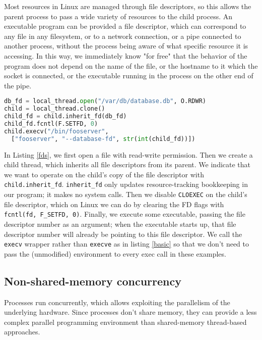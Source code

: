\documentclass{acmart}
\begin{document}
Most resources in Linux are managed through file descriptors,
so this allows the parent process to pass a wide variety of resources to the child process.
An executable program can be provided a file descriptor,
which can correspond to any file in any filesystem,
or to a network connection\cite{ucspi},
or a pipe connected to another process,
without the process being aware of what specific resource it is accessing.
In this way, we immediately know "for free"\cite{theoremsforfree}
that the behavior of the program does not depend on the name of the file,
or the hostname to it which the socket is connected,
or the executable running in the process on the other end of the pipe.
\begin{lstlisting}[float,language=Python,label={fds},caption={Passing down FDs}]
db_fd = local_thread.open("/var/db/database.db", O.RDWR)
child = local_thread.clone()
child_fd = child.inherit_fd(db_fd)
child_fd.fcntl(F.SETFD, 0)
child.execv("/bin/fooserver",
  ["fooserver", "--database-fd", str(int(child_fd))])
\end{lstlisting}
In Listing \ref{fds},
we first open a file with read-write permission.
Then we create a child thread,
which inherits all file descriptors from its parent.
We indicate that we want to operate on the child's copy of the file descriptor with \verb|child.inherit_fd|.
\verb|inherit_fd| only updates resource-tracking bookkeeping in our program;
it makes no system calls.
Then we disable \texttt{CLOEXEC} on the child's file descriptor,
which on Linux we can do by clearing the FD flags with \verb|fcntl(fd, F_SETFD, 0)|.
Finally, we execute some executable,
passing the file descriptor number as an argument;
when the executable starts up, that file descriptor number will already be pointing to this file descriptor.
We call the \texttt{execv} wrapper rather than \texttt{execve} as in listing \ref{basic}
so that we don't need to pass the (unmodified) environment to every exec call in these examples.
\subsection{Non-shared-memory concurrency}
Processes run concurrently,
which allows exploiting the parallelism of the underlying hardware.
Since processes don't share memory,
they can provide a less complex parallel programming environment
than shared-memory thread-based approaches.
\end{document}
